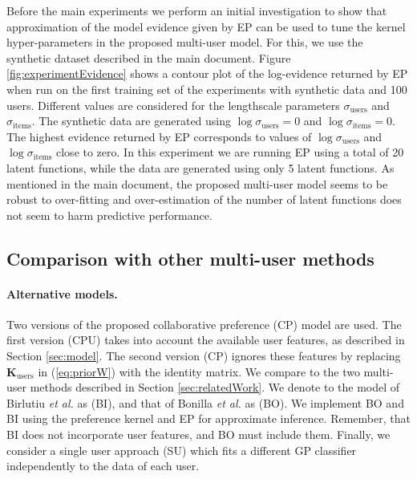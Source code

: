 Before the main experiments we perform an initial investigation to show that approximation of the model evidence given by EP can be used to
tune the kernel hyper-parameters in the proposed multi-user model. For this, we use the synthetic dataset
described in the main document. Figure \ref{fig:experimentEvidence} shows a contour plot of the log-evidence returned by EP 
when run on the first training set of the experiments with synthetic data and 100 users.
Different values are considered for the lengthscale parameters $\sigma_\text{users}$ and $\sigma_\text{items}$.
The synthetic data are generated using $\log \sigma_\text{users} = 0$ and $\log \sigma_\text{items} = 0$.
The highest evidence returned by EP corresponds to values of $\log \sigma_\text{users}$ and $\log \sigma_\text{items}$ close to zero.
In this experiment we are running EP using a total of 20 latent functions,
while the data are generated using only 5 latent functions.
As mentioned in the main document, the proposed multi-user model
seems to be robust to over-fitting and over-estimation of
the number of latent functions does not seem to harm predictive performance.

\subsection{Comparison with other multi-user methods}

\paragraph{Alternative models.} Two versions of the proposed collaborative preference (CP) model are used.
The first version (CPU) takes into account the available user features, as described in Section \ref{sec:model}. The second version (CP) ignores these features by
replacing $\mathbf{K}_\text{users}$ in (\ref{eq:priorW}) with the identity matrix.
We compare to the two multi-user methods described in Section \ref{sec:relatedWork}. 
We denote to the model of Birlutiu \emph{et al.} as (BI), and that of
Bonilla \emph{et al.} as (BO).
We implement BO and BI using the preference kernel and EP for approximate inference.
Remember, that BI does not incorporate user features, and BO must include them.
Finally, we consider a single user approach (SU) which fits a different GP classifier independently to the data of each user.

